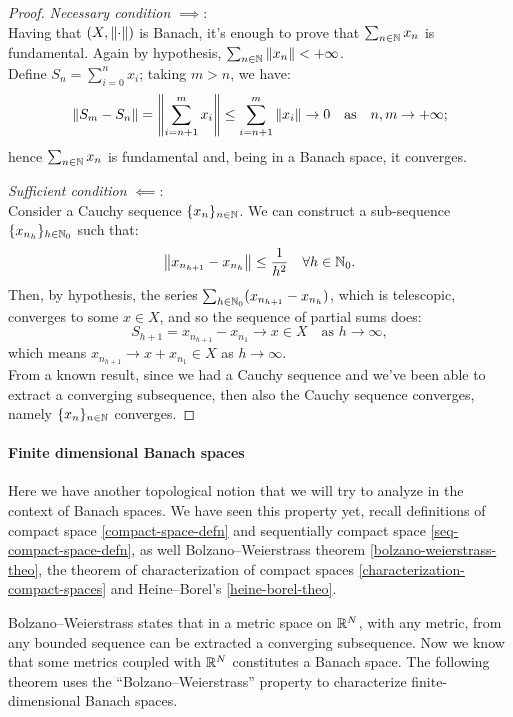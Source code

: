 \begin{proof}\textit{Necessary condition} $\implies$:\\
	Having that $(X, \left\lVert\cdot\right\rVert)$ is Banach, it's enough to prove that $\sum_{n\in\mathbb N} x_n$ is fundamental. Again by hypothesis, $\sum_{n\in\mathbb N} \left\lVert x_n\right\rVert < +\infty$.\\
	Define $S_n = \sum_{i=0}^{n} x_i$; taking $m > n$, we have:
	$$\left\lVert S_m - S_n\right\rVert
	= \left\lVert\sum_{i=n+1}^m x_i\right\rVert 
	\leq \sum^m_{i=n+1}\left\lVert x_i\right\rVert
	\to 0
	\quad \text{as}
	\quad n,m \to +\infty 
	;
	$$
	hence $\sum_{n\in\mathbb N} x_n$ is fundamental and, being in a Banach space, it converges.
		
	\textit{Sufficient condition} $\impliedby$:\\
	Consider a Cauchy sequence $\{x_n\}_{n \in \mathbb N}$.
	We can construct a sub-sequence $\{x_{n_h}\}_{h \in \mathbb N_0}$ such that:
	$$
	\left\lVert x_{n_{h+1}}-x_{n_h}\right\rVert
	\leq \frac 1{h^2} 
	\quad \forall h \in \mathbb N_0
	.
	$$
	Then, by hypothesis, the series $\sum_{h\in\mathbb N_0} (x_{n_{h+1}}-x_{n_h})$, which is telescopic, converges to some $x \in X$, and so the sequence of partial sums does:
	$$
	S_{h+1} = 
	x_{n_{h+1}}-x_{n_1} 
	\to x 
	\in X 
	\quad \text{as } 
	h
	\to \infty
	,
	$$
	which means $x_{n_{h+1}} \to x+x_{n_1} \in X$ as $h\to \infty$.\\
	From a known result, since we had a Cauchy sequence and we've been able to extract a converging subsequence, then also the Cauchy sequence converges, namely $\{x_n\}_{n \in \mathbb N}$ converges.
\end{proof}

\paragraph{Finite dimensional Banach spaces} Here we have another topological notion that we will try to analyze in the context of Banach spaces. We have seen this property yet, recall definitions of compact space \vref{compact-space-defn} and sequentially compact space \vref{seq-compact-space-defn}, as well Bolzano--Weierstrass theorem \vref{bolzano-weierstrass-theo}, the theorem of characterization of compact spaces \vref{characterization-compact-spaces} and Heine--Borel's \vref{heine-borel-theo}. 

Bolzano--Weierstrass states that in a metric space on $\mathbb R^N$, with any metric, from any bounded sequence can be extracted a converging subsequence. Now we know that some metrics coupled with $\mathbb R^N$ constitutes a Banach space. The following theorem uses the ``Bolzano--Weierstrass'' property to characterize finite-dimensional Banach spaces.

